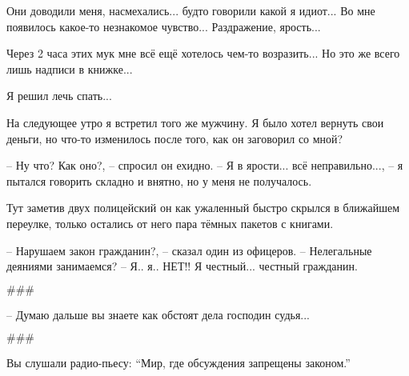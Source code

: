 Они доводили меня, насмехались... будто говорили какой я идиот... Во мне появилось какое-то незнакомое чувство...
Раздражение, ярость...

Через 2 часа этих мук мне всё ещё хотелось чем-то возразить... Но это же всего лишь надписи в книжке...

Я решил лечь спать...

На следующее утро я встретил того же мужчину. Я было хотел вернуть свои деньги, но что-то изменилось после того, как он заговорил со мной?

-- Ну что? Как оно?, -- спросил он ехидно.
-- Я в ярости... всё неправильно..., -- я пытался говорить складно и внятно, но у меня не получалось.

Тут заметив двух полицейский он как ужаленный быстро скрылся в ближайшем переулке, только остались от него пара тёмных пакетов с книгами.

-- Нарушаем закон гражданин?, -- сказал один из офицеров. -- Нелегальные деяниями занимаемся?
-- Я.. я.. НЕТ!! Я честный... честный гражданин.

\begin{center}\( \#\#\# \)\end{center}

-- Думаю дальше вы знаете как обстоят дела господин судья...

\begin{center}\( \#\#\# \)\end{center}

Вы слушали радио-пьесу: ``Мир, где обсуждения запрещены законом.''